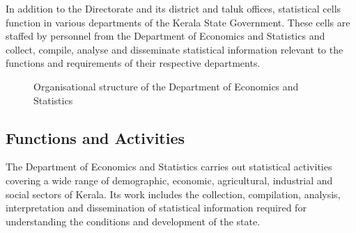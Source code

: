 \documentclass[12pt,a4paper]{article}
\begin{document}
\vspace{0.15cm}

In addition to the Directorate and its district and taluk offices, statistical cells function in various departments of the Kerala State Government. These cells are staffed by personnel from the Department of Economics and Statistics and collect, compile, analyse and disseminate statistical information relevant to the functions and requirements of their respective departments.

\begin{figure}[h]
\centering


\caption{Organisational structure of the Department of Economics and Statistics}
\label{fig:des-organisation}

\end{figure}

\subsection{Functions and Activities}

The Department of Economics and Statistics carries out statistical activities covering a wide range of demographic, economic, agricultural, industrial and social sectors of Kerala. Its work includes the collection, compilation, analysis, interpretation and dissemination of statistical information required for understanding the conditions and development of the state.
\end{document}
